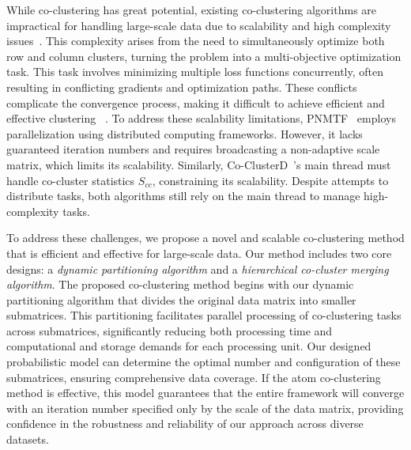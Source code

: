\documentclass[journal]{IEEEtran}
\renewcommand{\cite}[1]{~\autocite{#1}}
\begin{document}
While co-clustering has great potential, existing co-clustering algorithms are impractical for handling large-scale data due to scalability and high complexity issues\cite{cheng2015CoClusterDDistributedFramework}. This complexity arises from the need to simultaneously optimize both row and column clusters,  turning the problem into a multi-objective optimization task. This task involves minimizing multiple loss functions concurrently, often resulting in conflicting gradients and optimization paths. These conflicts complicate the convergence process, making it difficult to achieve efficient and effective clustering \cite{coello2007EvolutionaryAlgorithmsSolving}. To address these scalability limitations, PNMTF\cite{chen2023ParallelNonNegativeMatrix} employs parallelization using distributed computing frameworks. However, it lacks guaranteed iteration numbers and requires broadcasting a non-adaptive scale matrix, which limits its scalability. Similarly, Co-ClusterD\cite{cheng2015CoClusterDDistributedFramework}'s main thread must handle co-cluster statistics \(S_{cc}\), constraining its scalability. Despite attempts to distribute tasks, both algorithms still rely on the main thread to manage high-complexity tasks.


To address these challenges, we propose a novel and scalable co-clustering method that is efficient and effective for large-scale data. Our method includes two core designs: a \textit{dynamic partitioning algorithm} and a \textit{hierarchical co-cluster merging algorithm}.
The proposed co-clustering method begins with our dynamic partitioning algorithm that divides the original data matrix into smaller submatrices. This partitioning facilitates parallel processing of co-clustering tasks across submatrices, significantly reducing both processing time and computational and storage demands for each processing unit. Our designed probabilistic model can determine the optimal number and configuration of these submatrices, ensuring comprehensive data coverage. If the atom co-clustering method is effective, this model guarantees that the entire framework will converge with an iteration number specified only by the scale of the data matrix, providing confidence in the robustness and reliability of our approach across diverse datasets.
\end{document}
